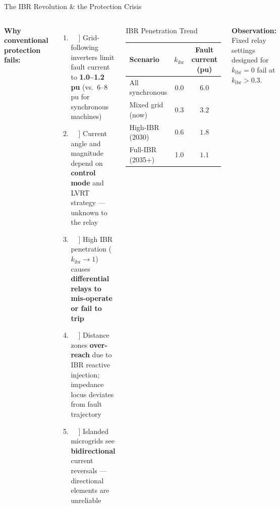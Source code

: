 \documentclass[10pt,aspectratio=169]{beamer}
\newcommand{\bitem}[1]{%
  \makebox[16pt]{\textcolor{white}{\colorbox{iitmblue}{\bfseries\scriptsize#1}}}\,%
}
\newcommand{\obs}[1]{%
  {\color{iitmred}\textbf{Observation:} #1}%
}
\newcommand{\kibr}{k_{\mathrm{ibr}}}
\begin{document}
\begin{frame}{The IBR Revolution \& the Protection Crisis}
  \begin{columns}[T]
      \textbf{Why conventional protection fails:}
      \medskip
      \begin{enumerate}\itemsep5pt
        \item[\bitem{1}] Grid-following inverters limit fault current to
          \textbf{1.0–1.2 pu} (vs.\ 6–8 pu for synchronous machines)
        \item[\bitem{2}] Current angle and magnitude depend on
          \textbf{control mode} and LVRT strategy — unknown to the relay
        \item[\bitem{3}] High IBR penetration (\(\kibr \to 1\)) causes
          \textbf{differential relays to mis-operate or fail to trip}
        \item[\bitem{4}] Distance zones \textbf{over-reach} due to IBR reactive
          injection; impedance locus deviates from fault trajectory
        \item[\bitem{5}] Islanded microgrids see \textbf{bidirectional}
          current reversals — directional elements are unreliable
      \end{enumerate}
      \begin{block}{\small IBR Penetration Trend}
        \small
        \centering
        \begin{tabular}{lcc}
          \toprule
          Scenario & $\kibr$ & Fault current (pu)\\
          \midrule
          All synchronous & 0.0 & $6.0$\\
          Mixed grid (now) & 0.3 & $3.2$\\
          High-IBR (2030) & 0.6 & $1.8$\\
          Full-IBR (2035+) & 1.0 & $1.1$\\
          \bottomrule
        \end{tabular}
      \end{block}
      \vspace{0.3cm}
      \obs{Fixed relay settings designed for $\kibr\!=\!0$ fail
        at $\kibr\!>\!0.3$.}
  \end{columns}
\end{frame}
\end{document}
